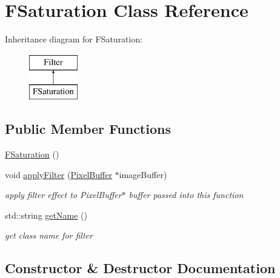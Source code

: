 \hypertarget{classFSaturation}{}\section{F\+Saturation Class Reference}
\label{classFSaturation}
Inheritance diagram for F\+Saturation\+:\begin{figure}[H]
\begin{center}
\leavevmode
\includegraphics[height=2.000000cm]{classFSaturation}
\end{center}
\end{figure}
\subsection*{Public Member Functions}
\begin{DoxyCompactItemize}
\item 
\hyperlink{classFSaturation_a164678727eb7204e4946578b339617b7}{F\+Saturation} ()
\item 
void \hyperlink{classFSaturation_a9e35fd05500411807bfcbe36b8f24a55}{apply\+Filter} (\hyperlink{classPixelBuffer}{Pixel\+Buffer} $\ast$image\+Buffer)\hypertarget{classFSaturation_a9e35fd05500411807bfcbe36b8f24a55}{}\label{classFSaturation_a9e35fd05500411807bfcbe36b8f24a55}

\begin{DoxyCompactList}\small\item\em apply filter effect to Pixel\+Buffer$\ast$ buffer passed into this function \end{DoxyCompactList}\item 
std\+::string \hyperlink{classFSaturation_a55d272a3a50fcb65d94a66821b7b0c73}{get\+Name} ()\hypertarget{classFSaturation_a55d272a3a50fcb65d94a66821b7b0c73}{}\label{classFSaturation_a55d272a3a50fcb65d94a66821b7b0c73}

\begin{DoxyCompactList}\small\item\em get class name for filter \end{DoxyCompactList}\end{DoxyCompactItemize}


\subsection{Constructor \& Destructor Documentation}
